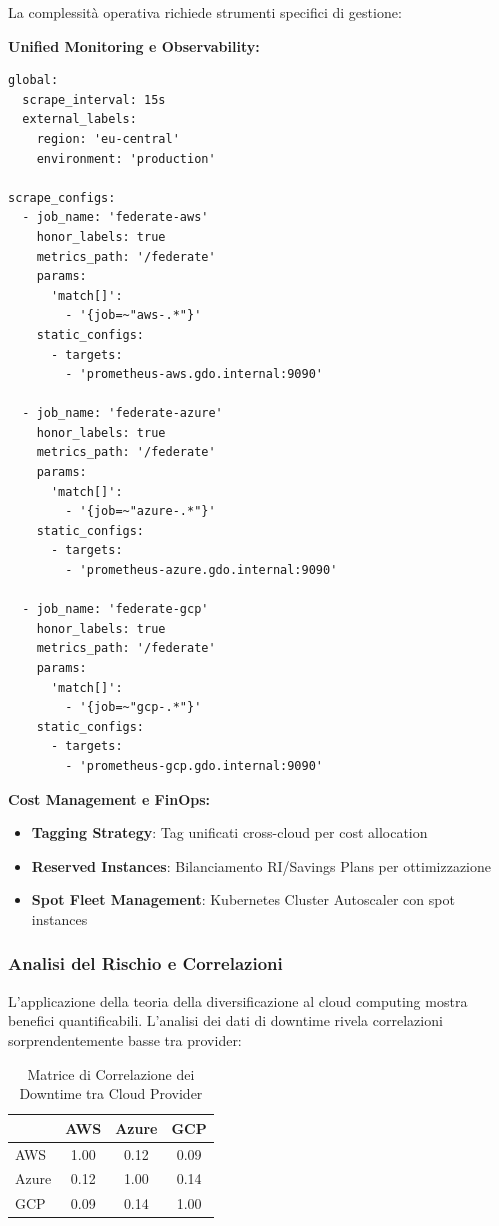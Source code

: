 La complessità operativa richiede strumenti specifici di gestione:

\textbf{Unified Monitoring e Observability:}
\begin{lstlisting}[caption={Prometheus Federation per Multi-Cloud},label={lst:prometheus_federation}]
global:
  scrape_interval: 15s
  external_labels:
    region: 'eu-central'
    environment: 'production'

scrape_configs:
  - job_name: 'federate-aws'
    honor_labels: true
    metrics_path: '/federate'
    params:
      'match[]':
        - '{job=~"aws-.*"}'
    static_configs:
      - targets:
        - 'prometheus-aws.gdo.internal:9090'
        
  - job_name: 'federate-azure'
    honor_labels: true
    metrics_path: '/federate'
    params:
      'match[]':
        - '{job=~"azure-.*"}'
    static_configs:
      - targets:
        - 'prometheus-azure.gdo.internal:9090'
        
  - job_name: 'federate-gcp'
    honor_labels: true
    metrics_path: '/federate'
    params:
      'match[]':
        - '{job=~"gcp-.*"}'
    static_configs:
      - targets:
        - 'prometheus-gcp.gdo.internal:9090'
\end{lstlisting}

\textbf{Cost Management e FinOps:}
\begin{itemize}
    \item \textbf{Tagging Strategy}: Tag unificati cross-cloud per cost allocation
    \item \textbf{Reserved Instances}: Bilanciamento RI/Savings Plans per ottimizzazione
    \item \textbf{Spot Fleet Management}: Kubernetes Cluster Autoscaler con spot instances
\end{itemize}

\subsubsection{\texorpdfstring{\textbf{Analisi del Rischio e Correlazioni}}{3.4.2.4 - Analisi del Rischio e Correlazioni}}

L'applicazione della teoria della diversificazione\autocite{Tang2024portfolio} al cloud computing mostra benefici quantificabili. L'analisi dei dati di downtime rivela correlazioni sorprendentemente basse tra provider:

\begin{table}[htbp]
\centering
\caption{Matrice di Correlazione dei Downtime tra Cloud Provider}
\label{tab:cloud_correlation}
\begin{tabular}{lccc}
\toprule
& AWS & Azure & GCP \\
\midrule
AWS & 1.00 & 0.12 & 0.09 \\
Azure & 0.12 & 1.00 & 0.14 \\
GCP & 0.09 & 0.14 & 1.00 \\
\bottomrule
\end{tabular}
\end{table}

